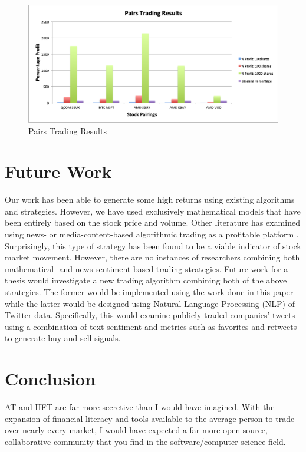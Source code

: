 \documentclass[letterpaper,11pt]{article}
\begin{document}
\begin{figure}[h]
\centering
\includegraphics[width=.9\textwidth]{pairstradingresults.png}
\caption{Pairs Trading Results \label{overflow}}
\label{PAIRSRESULTSfigure}
\end{figure}

\section{Future Work}
Our work has been able to generate some high returns using existing algorithms and strategies. However, we have used exclusively mathematical models that have been entirely based on the stock price and volume. Other literature has examined using news- or media-content-based algorithmic trading as a profitable platform \cite{Zhang2010}. Surprisingly, this type of strategy has been found to be a viable indicator of stock market movement. However, there are no instances of researchers combining both mathematical- and news-sentiment-based trading strategies. Future work for a thesis would investigate a new trading algorithm combining both of the above strategies. The former would be implemented using the work done in this paper while the latter would be designed using Natural Language Processing (NLP) of Twitter data. Specifically, this would examine  publicly traded companies' tweets using a combination of text sentiment and metrics such as favorites and retweets to generate buy and sell signals.


\section{Conclusion}

AT and HFT are far more secretive than I would have imagined. With the expansion of financial literacy and tools available to the average person to trade over nearly every market, I would have expected a far more open-source, collaborative community that you find in the software/computer science field. 
\end{document}
